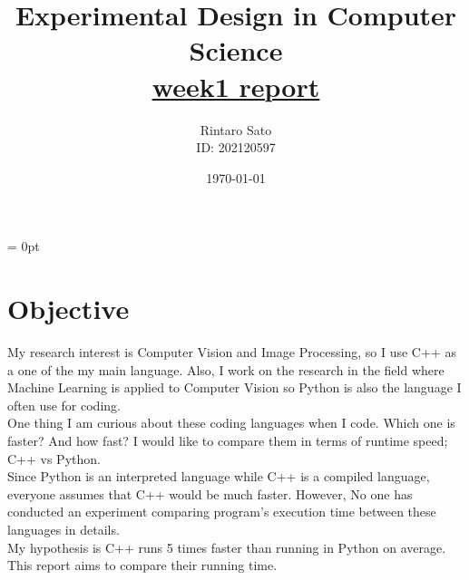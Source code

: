 \documentclass[11pt, a4paper]{article}
\title{Experimental Design in Computer Science \\ \href{https://manaba.tsukuba.ac.jp/ct/course_1910418_report_1960312}{\underline{week1 report}}}
\author{Rintaro Sato \\ ID: 202120597}
\date{\today}
\begin{document}
\noindent
\parindent = 0pt

\maketitle



\section{Objective}
My research interest is Computer Vision and Image Processing, so I use C++ as a one of the my main language. Also, I work on the research in the field where Machine Learning is applied to Computer Vision so Python is also the language I often use for coding.\\

One thing I am curious about these coding languages when I code. Which one is faster? And how fast? I would like to compare them in terms of runtime speed; C++ vs Python.\\

Since Python is an interpreted language while C++ is a compiled language, everyone assumes that C++ would be much faster. However, No one has conducted an experiment comparing program's execution time between these languages in details.\\

My hypothesis is C++ runs 5 times faster than running in Python on average. This report aims to compare their running time.

\end{document}
